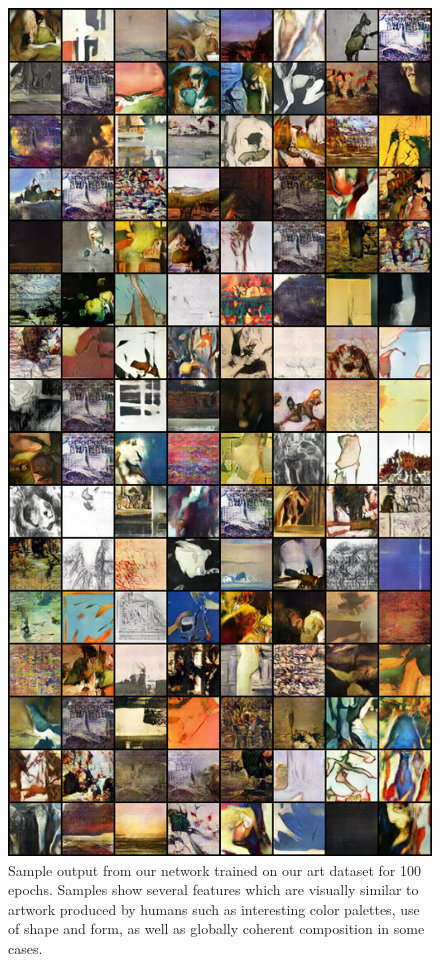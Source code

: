 \documentclass[10pt,twocolumn,letterpaper]{article}
\begin{document}
\begin{figure}[t]
	\begin{center}
		\includegraphics[width=0.9\linewidth]{art_samples.png}
	\end{center}
	\caption{Sample output from our network trained on our art dataset for 100 epochs. Samples show several features which are visually similar to artwork produced by humans such as interesting color palettes, use of shape and form, as well as globally coherent composition in some cases.}
	\label{fig:long}
	\label{fig:onecol}
\end{figure}
\end{document}
